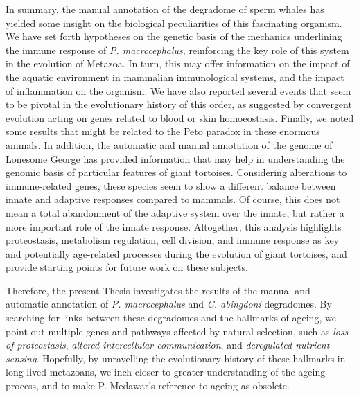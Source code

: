 In summary, the manual annotation of the degradome of sperm whales has yielded some insight on the biological peculiarities of this fascinating organism.
We have set forth hypotheses on the genetic basis of the mechanics underlining the immune response of \textit{P. macrocephalus}, reinforcing the key role of this system in the evolution of Metazoa.
In turn, this may offer information on the impact of the aquatic environment in mammalian immunological systems, and the impact of inflammation on the organism.
We have also reported several events that seem to be pivotal in the evolutionary history of this order, as suggested by convergent evolution acting on genes related to blood or skin homoeostasis.
Finally, we noted some results that might be related to the Peto paradox in these enormous animals.
In addition, the automatic and manual annotation of the genome of Lonesome George has provided information that may help in understanding the genomic basis of particular features of giant tortoises.
Considering alterations to immune-related genes, these species seem to show a different balance between innate and adaptive responses compared to mammals.
Of course, this does not mean a total abandonment of the adaptive system over the innate, but rather a more important role of the innate response.
Altogether, this analysis highlights proteostasis, metabolism regulation, cell division, and immune response as key and potentially age-related processes during the evolution of giant tortoises, and provide starting points for future work on these subjects.

Therefore, the present Thesis investigates the results of the manual and automatic annotation of \textit{P. macrocephalus} and \textit{C. abingdoni} degradomes.
By searching for links between these degradomes and the hallmarks of ageing, we point out multiple genes and pathways affected by natural selection, such as \emph{loss of proteostasis}, \emph{altered intercellular communication}, and \emph{deregulated nutrient sensing}.
Hopefully, by unravelling the evolutionary history of these hallmarks in long-lived metazoans, we inch closer to greater understanding of the ageing process, and to make P. Medawar's reference to ageing as  obsolete.
